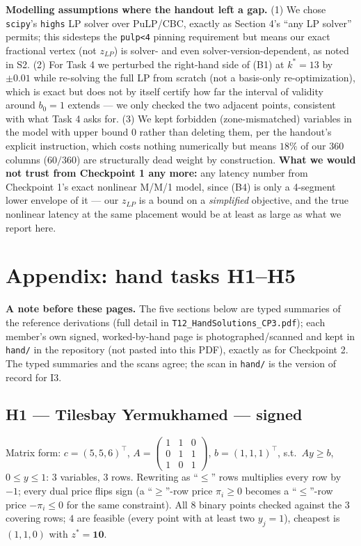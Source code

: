 \documentclass[11pt]{article}
\begin{document}
\textbf{Modelling assumptions where the handout left a gap.} (1) We chose \texttt{scipy}'s
\texttt{highs} LP solver over PuLP/CBC, exactly as Section 4's ``any LP solver'' permits; this
sidesteps the \texttt{pulp<4} pinning requirement but means our exact fractional vertex (not
$z_{LP}$) is solver- and even solver-version-dependent, as noted in S2. (2) For Task 4 we
perturbed the right-hand side of (B1) at $k^\ast=13$ by $\pm0.01$ while re-solving the full LP
from scratch (not a basis-only re-optimization), which is exact but does not by itself certify how
far the interval of validity around $b_0=1$ extends --- we only checked the two adjacent points,
consistent with what Task 4 asks for. (3) We kept forbidden (zone-mismatched) variables in the
model with upper bound $0$ rather than deleting them, per the handout's explicit instruction,
which costs nothing numerically but means $18\%$ of our $360$ columns ($60/360$) are structurally
dead weight by construction. \textbf{What we would not trust from Checkpoint 1 any more:} any
latency number from Checkpoint 1's exact nonlinear M/M/1 model, since (B4) is only a 4-segment
lower envelope of it --- our $z_{LP}$ is a bound on a \emph{simplified} objective, and the true
nonlinear latency at the same placement would be at least as large as what we report here.

\clearpage
\appendix
\section*{Appendix: hand tasks H1--H5}
\textbf{A note before these pages.} The five sections below are typed summaries of the reference
derivations (full detail in \texttt{T12\_HandSolutions\_CP3.pdf}); each member's own signed,
worked-by-hand page is photographed/scanned and kept in \texttt{hand/} in the repository (not
pasted into this PDF), exactly as for Checkpoint 2. The typed summaries and the scans agree; the
scan in \texttt{hand/} is the version of record for I3.

\subsection*{H1 --- Tilesbay Yermukhamed --- signed}
Matrix form: $c=(5,5,6)^\top$, $A=\begin{pmatrix}1&1&0\\0&1&1\\1&0&1\end{pmatrix}$,
$b=(1,1,1)^\top$, s.t.\ $Ay\ge b$, $0\le y\le1$: $3$ variables, $3$ rows. Rewriting as ``$\le$''
rows multiplies every row by $-1$; every dual price flips sign (a ``$\ge$''-row price $\pi_i\ge0$
becomes a ``$\le$''-row price $-\pi_i\le0$ for the same constraint). All $8$ binary points
checked against the $3$ covering rows; $4$ are feasible (every point with at least two $y_j=1$),
cheapest is $(1,1,0)$ with $z^\ast=\mathbf{10}$.
\end{document}
